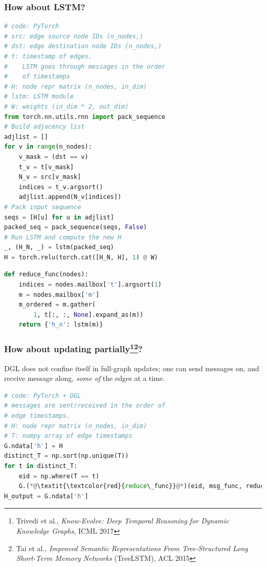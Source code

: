 \documentclass[10pt,aspectratio=169]{beamer}
\begin{document}
	\begin{frame}[fragile]
		\frametitle{How about LSTM?}
		\begin{minipage}{0.5\textwidth}
\begin{lstlisting}[language=Python]
# code: PyTorch
# src: edge source node IDs (n_nodes,)
# dst: edge destination node IDs (n_nodes,)
# t: timestamp of edges.
#    LSTM goes through messages in the order
#    of timestamps
# H: node repr matrix (n_nodes, in_dim)
# lstm: LSTM module
# W: weights (in_dim * 2, out_dim)
from torch.nn.utils.rnn import pack_sequence
# Build adjacency list
adjlist = []
for v in range(n_nodes):
    v_mask = (dst == v)
    t_v = t[v_mask]
    N_v = src[v_mask]
    indices = t_v.argsort()
    adjlist.append(N_v[indices])
# Pack input sequence
seqs = [H[u] for u in adjlist]
packed_seq = pack_sequence(seqs, False)
# Run LSTM and compute the new H
_, (H_N, _) = lstm(packed_seq)
H = torch.relu(torch.cat([H_N, H], 1) @ W)
\end{lstlisting}
		\end{minipage}%
		\begin{minipage}{0.5\textwidth}
\begin{lstlisting}[language=Python]
def reduce_func(nodes):
    indices = nodes.mailbox['t'].argsort(1)
    m = nodes.mailbox['m']
    m_ordered = m.gather(
        1, t[:, :, None].expand_as(m))
    return {'h_n': lstm(m)}
\end{lstlisting}
		\end{minipage}
	\end{frame}

	\begin{frame}[fragile]
		\frametitle{How about updating partially\footnote{Trivedi et al., \emph{Know-Evolve: Deep Temporal Reasoning for Dynamic Knowledge Graphs}, ICML 2017}\footnote{Tai et al., \emph{Improved Semantic Representations From Tree-Structured Long Short-Term Memory Networks}  (TreeLSTM), ACL 2015}?}
		DGL does not confine itself in full-graph updates; one can send messages on, and receive message along, \emph{some of} the edges at a time.
		\begin{center}
			\centering
			\begin{minipage}{0.5\textwidth}
\begin{lstlisting}[language=Python]
# code: PyTorch + DGL
# messages are sent/received in the order of
# edge timestamps.
# H: node repr matrix (n_nodes, in_dim)
# T: numpy array of edge timestamps
G.ndata['h'] = H
distinct_T = np.sort(np.unique(T))
for t in distinct_T:
    eid = np.where(T == t)
    G.(*@\textit{\textcolor{red}{reduce\_func}}@*)(eid, msg_func, reduce_func)
H_output = G.ndata['h']
\end{lstlisting}
			\end{minipage}
		\end{center}
	\end{frame}
\end{document}
